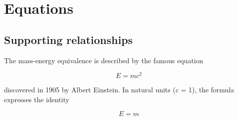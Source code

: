 \documentclass[../Dissertation]{subfiles}
\begin{document}
    \chapter{Equations}\label{AppendixB}
    
    \section{Supporting relationships}
    The mass-energy equivalence is described by the famous equation

    \begin{equation}
        E=mc^2
    \end{equation}

    \noindent discovered in 1905 by Albert Einstein. 
    In natural units ($c$ = 1), the formula expresses the identity

    \begin{equation}
        E=m
    \end{equation}
\end{document}
